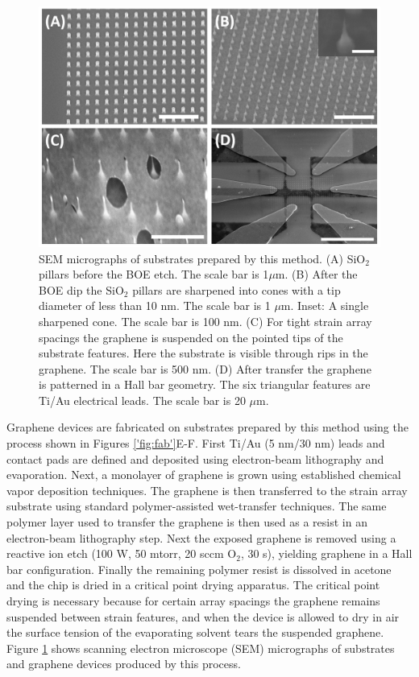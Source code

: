 \documentclass[%
 aip,
 apl,%
 amsmath,amssymb,
 reprint,%
]{revtex4-1}
\begin{document}
\begin{figure}
\centering
\includegraphics[width=\columnwidth]{Figure2}
\caption{SEM micrographs of substrates prepared by this method. 
(A) SiO$_2$ pillars before the BOE etch. The scale bar is 1$\mu$m.
(B) After the BOE dip the SiO$_2$ pillars are sharpened into cones with a tip diameter of less than 10 nm.
The scale bar is 1 $\mu$m. Inset: A single sharpened cone. The scale bar is 100 nm.
(C) For tight strain array spacings the graphene is suspended on the pointed tips of the substrate features.
Here the substrate is visible through rips in the graphene. The scale bar is 500 nm.
(D) After transfer the graphene is patterned in a Hall bar geometry. The six triangular features are Ti/Au
electrical leads. The scale bar is 20 $\mu$m.}
\label{'fig:sem'}
\end{figure}

Graphene devices are fabricated on substrates prepared by this method using the process shown in Figures \ref{'fig:fab'}E-F. 
First Ti/Au (5 nm/30 nm) leads and contact pads are defined and deposited using electron-beam lithography and evaporation. 
Next, a monolayer of graphene is grown using established chemical vapor deposition techniques\cite{Li2009}. 
The graphene is then transferred to the strain array substrate using standard polymer-assisted wet-transfer 
techniques\cite{li2009transfer}. The same polymer layer used to transfer the graphene is then used as a 
resist in an electron-beam lithography step. Next the exposed graphene is removed using a reactive ion etch 
(100 W, 50 mtorr, 20 sccm O$_2$, 30 s), yielding graphene in a Hall bar configuration. Finally the remaining 
polymer resist is dissolved in acetone and the chip is dried in a critical point drying apparatus. 
The critical point drying is necessary because for certain array spacings the graphene remains suspended between
strain features, and when the device is allowed to dry in air the surface tension 
of the evaporating solvent tears the suspended graphene.
Figure \ref{'fig:sem'} shows scanning electron microscope (SEM) micrographs of substrates and
graphene devices produced by this process.
\end{document}
